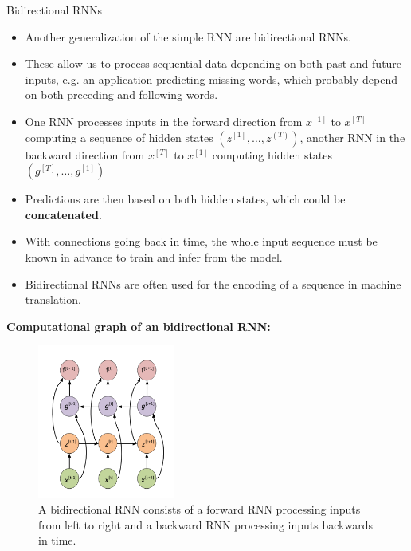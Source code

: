\begin{vbframe}{Bidirectional RNNs}
  \begin{itemize}
    \item Another generalization of the simple RNN are bidirectional RNNs.
    \item These allow us to process sequential data depending on both past and future inputs, e.g. an application predicting missing words, which probably depend on both preceding and following words.
    \item One RNN processes inputs in the forward direction from $x^{[1]}$ to $x^{[T]}$ computing a sequence of hidden states $(z^{[1]}, \dots, z^{(T)})$, another RNN in the backward direction from $x^{[T]}$ to $x^{[1]}$ computing hidden states $(g^{[T]}, \dots, g^{[1]})$
    \item Predictions are then based on both hidden states, which could be \textbf{concatenated}.
    \item With connections going back in time, the whole input sequence must be known in advance
to train and infer from the model.
    \item Bidirectional RNNs are often used for the encoding of a sequence in machine translation.
  \end{itemize}
\framebreak  
\textbf{Computational graph of an bidirectional RNN:}
  \begin{figure}
    \includegraphics[width=4.5cm]{plots/bi_rnn.png}
    \caption{A bidirectional RNN consists of a forward RNN processing inputs from left to right
and a backward RNN processing inputs backwards in time.}
  \end{figure} 
\end{vbframe}


